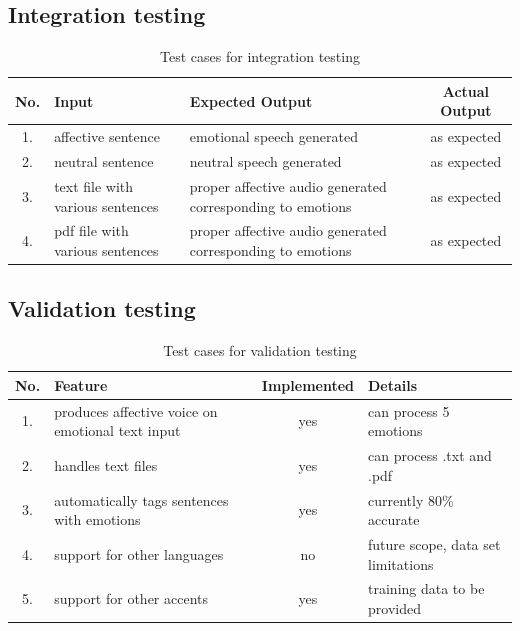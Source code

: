 \documentclass[oneside,a4paper,12pt]{book}
\begin{document}
\subsection{Integration testing}
\begin{table}[!htbp]
	\def\arraystretch{1.5}
	\begin{tabularx}{\textwidth}{|c|X|X|c|}
		\hline 
		No. & Input	& Expected Output & Actual Output \\ \hline
		1. & affective sentence & emotional speech generated & as expected \\ \hline
		2. & neutral sentence & neutral speech generated & as expected \\ \hline
		3. & text file with various sentences & proper affective audio generated corresponding to emotions & as expected \\ \hline
		4. & pdf file with various sentences & proper affective audio generated corresponding to emotions & as expected \\ \hline
	\end{tabularx}
	\caption{Test cases for integration testing}
	\label{tab:testcases}
\end{table}

\newpage
\subsection{Validation testing}   
\begin{table}[!htbp]
	\def\arraystretch{1.5}
	\begin{tabularx}{\textwidth}{|c|X|c|X|}
		\hline 
		No. & Feature	& Implemented & Details \\ \hline
		1. & produces affective voice on emotional text input & yes & can process 5 emotions \\ \hline
		2. & handles text files & yes & can process .txt and .pdf \\ \hline
		3. & automatically tags sentences with emotions & yes & currently 80\% accurate \\ \hline
		4. & support for other languages & no & future scope, data set limitations \\ \hline
		5. & support for other accents & yes & training data to be provided \\ \hline
	\end{tabularx}
	\caption{Test cases for validation testing}
	\label{tab:testcases}
\end{table}
\end{document}
